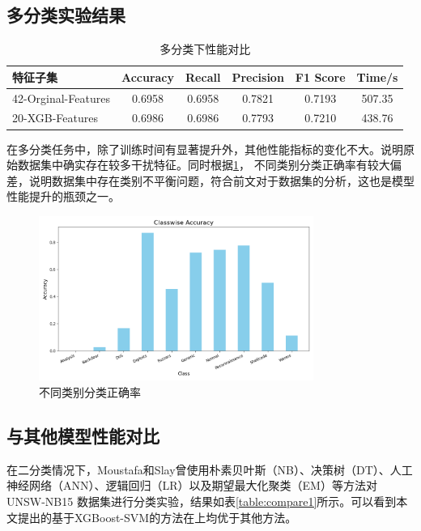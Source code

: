 \documentclass{article}
\begin{document}
\subsection{多分类实验结果}

\begin{table}[H]
  \caption{多分类下性能对比}
  \label{table:feature_selection_performance_m}
  \centering
  \begin{tabular}{lccccc}
    \toprule
    特征子集          & Accuracy & Recall & Precision & F1 Score & Time/s \\ \midrule
    42-Orginal-Features     & 0.6958   & 0.6958 & 0.7821    & 0.7193   & 507.35  \\    
    20-XGB-Features    & 0.6986   & 0.6986 & 0.7793    & 0.7210   & 438.76  \\\bottomrule 

  \end{tabular}
\end{table}
在多分类任务中，除了训练时间有显著提升外，其他性能指标的变化不大。说明原始数据集中确实存在较多干扰特征。同时根据\ref{fig:class}，
不同类别分类正确率有较大偏差，说明数据集中存在类别不平衡问题，符合前文对于数据集的分析，这也是模型性能提升的瓶颈之一。

\begin{figure}[htpb]
  \centering
  \includegraphics[width=0.8\textwidth]{./png/classwise_accuracy.png}
  \caption{不同类别分类正确率}
  \label{fig:class}
\end{figure}

\subsection{与其他模型性能对比}
在二分类情况下，Moustafa和Slay曾使用朴素贝叶斯（NB）、决策树（DT）、人工神经网络（ANN）、逻辑回归（LR）以及期望最大化聚类（EM）等方法对UNSW-NB15
数据集进行分类实验，结果如表\ref{table:compare1}所示。可以看到本文提出的基于XGBoost-SVM的方法在上均优于其他方法。
\end{document}
